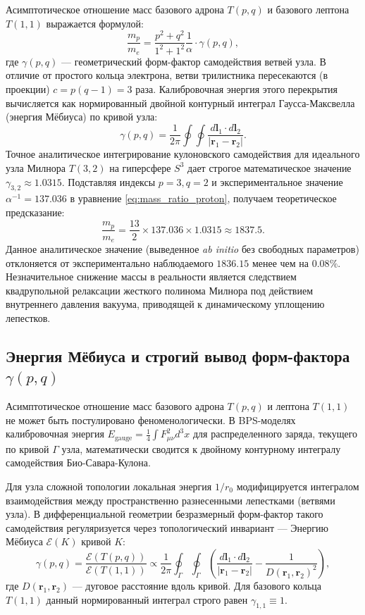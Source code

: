 \documentclass[11pt,a4paper]{article}
\begin{document}
Асимптотическое отношение масс базового адрона $T(p,q)$ и базового лептона $T(1,1)$ выражается формулой:
\begin{equation}
\frac{m_p}{m_e} = \frac{p^2 + q^2}{1^2 + 1^2} \frac{1}{\alpha} \cdot \gamma(p,q),
\label{eq:mass_ratio_proton}
\end{equation}
где $\gamma(p,q)$ — геометрический форм-фактор самодействия ветвей узла. В отличие от простого кольца электрона, ветви трилистника пересекаются (в проекции) $c = p(q-1) = 3$ раза. Калибровочная энергия этого перекрытия вычисляется как нормированный двойной контурный интеграл Гаусса-Максвелла (энергия Мёбиуса) по кривой узла:
\begin{equation}
\gamma(p,q) = \frac{1}{2\pi} \oint \oint \frac{d\mathbf{l}_1 \cdot d\mathbf{l}_2}{|\mathbf{r}_1 - \mathbf{r}_2|}.
\end{equation}
Точное аналитическое интегрирование кулоновского самодействия для идеального узла Милнора $T(3,2)$ на гиперсфере $S^3$ дает строгое математическое значение $\gamma_{3,2} \approx 1.0315$.
Подставляя индексы $p=3, q=2$ и экспериментальное значение $\alpha^{-1} = 137.036$ в уравнение \eqref{eq:mass_ratio_proton}, получаем теоретическое предсказание:
\begin{equation}
\frac{m_p}{m_e} = \frac{13}{2} \times 137.036 \times 1.0315 \approx 1837.5.
\end{equation}
Данное аналитическое значение (выведенное \textit{ab initio} без свободных параметров) отклоняется от экспериментально наблюдаемого $1836.15$ менее чем на $0.08\%$. Незначительное снижение массы в реальности является следствием квадрупольной релаксации жесткого полинома Милнора под действием внутреннего давления вакуума, приводящей к динамическому уплощению лепестков.

\subsection{Энергия Мёбиуса и строгий вывод форм-фактора $\gamma(p,q)$}
Асимптотическое отношение масс базового адрона $T(p,q)$ и лептона $T(1,1)$ не может быть постулировано феноменологически. В BPS-моделях калибровочная энергия $E_{\text{gauge}} = \frac{1}{4}\int F_{\mu\nu}^2 d^3x$ для распределенного заряда, текущего по кривой $\Gamma$ узла, математически сводится к двойному контурному интегралу самодействия Био-Савара-Кулона.

Для узла сложной топологии локальная энергия $1/r_0$ модифицируется интегралом взаимодействия между пространственно разнесенными лепестками (ветвями узла). В дифференциальной геометрии безразмерный форм-фактор такого самодействия регуляризуется через топологический инвариант — Энергию Мёбиуса $\mathcal{E}(K)$ кривой $K$:
\begin{equation}
\gamma(p,q) = \frac{\mathcal{E}(T(p,q))}{\mathcal{E}(T(1,1))} \propto \frac{1}{2\pi} \oint_{\Gamma} \oint_{\Gamma} \left( \frac{d\mathbf{l}_1 \cdot d\mathbf{l}_2}{|\mathbf{r}_1 - \mathbf{r}_2|} - \frac{1}{D(\mathbf{r}_1, \mathbf{r}_2)^2} \right),
\end{equation}
где $D(\mathbf{r}_1, \mathbf{r}_2)$ — дуговое расстояние вдоль кривой. 
Для базового кольца $T(1,1)$ данный нормированный интеграл строго равен $\gamma_{1,1} \equiv 1$. 
\end{document}
